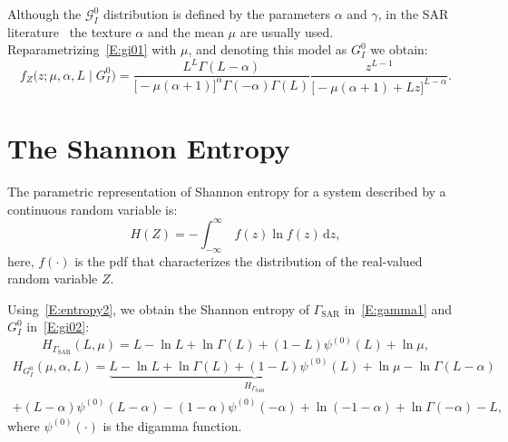 Although the \(\mathcal{G}_I^0\) distribution is defined by the
parameters \(\alpha\) and \(\gamma\), in the SAR
literature~\citep{Nascimento2010} the texture \(\alpha\) and the mean
\(\mu\) are usually used. 
Reparametrizing~\eqref{E:gi01} with \(\mu\),
and denoting this model as \(G_I^0\) we obtain: 
\begin{equation}
        f_Z\big(z; \mu, \alpha, L\mid G_I^0\big) = \frac{L^L\Gamma(L-\alpha)}{\big[-\mu(\alpha+1)\big]^{\alpha}\Gamma(-\alpha)\Gamma(L)} \frac{z^{L-1}}{\big[-\mu(\alpha+1)+Lz\big]^{L-\alpha}}.\label{E:gi02}
\end{equation}


\section{The Shannon Entropy}\label{the-shannon-entropy}

The parametric representation of Shannon entropy for a system described
by a continuous random variable is: \begin{equation}
  \label{E:entropy2}
  H(Z)=-\int_{-\infty }^\infty \ f(z)\ln f(z)\, \mathrm{d}z,
\end{equation} here, \(f(\cdot)\) is the pdf that characterizes the
distribution of the real-valued random variable \(Z\).

Using~\eqref{E:entropy2}, we obtain the Shannon entropy of \(\Gamma_{\text{SAR}}\) in~\eqref{E:gamma1} and \(G_I^0\) in~\eqref{E:gi02}:
\begin{equation}
\label{E:E-gamma}
H_{\Gamma_{\text{SAR}}}(L, \mu) =   L -\ln L+\ln\Gamma(L)+(1-L)\psi^{(0)}(L) + \ln \mu, 
\end{equation}
\begin{multline}
\label{E:E-GIO}
H_{G_I^0}(\mu, \alpha, L) =\underbrace{L -\ln L+\ln\Gamma(L)+(1-L)\psi^{(0)}(L) +\ln \mu}_{H_{\Gamma_{\text{SAR}}}} -\ln\Gamma(L-\alpha)\\
+ (L-\alpha) \psi^{(0)}(L-\alpha)-(1-\alpha)\psi^{(0)}(-\alpha)+\ln (-1-\alpha)+\ln\Gamma(-\alpha)-L,
\end{multline}
where \(\psi^{(0)}(\cdot)\) is the digamma function. 
 
